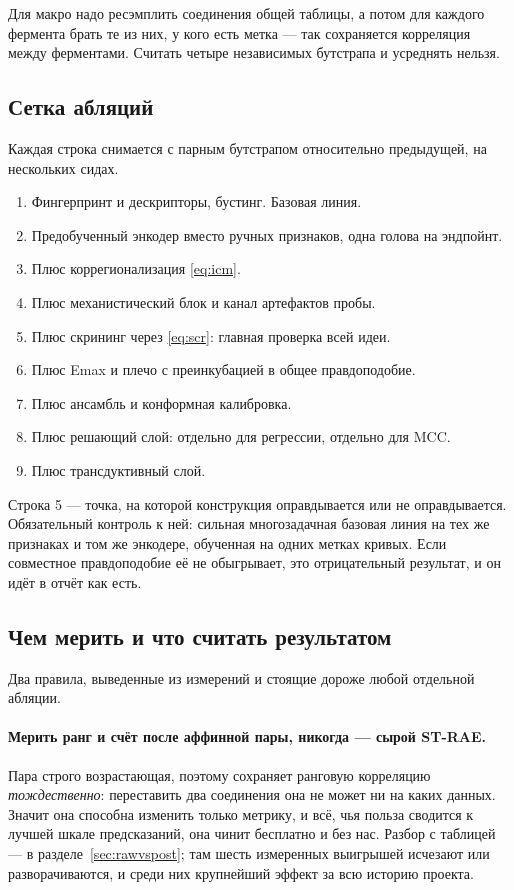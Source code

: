 Для макро надо ресэмплить соединения общей таблицы, а потом для каждого фермента брать те из них,
у кого есть метка --- так сохраняется корреляция между ферментами. Считать четыре независимых бутстрапа
и усреднять нельзя.

\subsection{Сетка абляций}

Каждая строка снимается с парным бутстрапом относительно предыдущей, на нескольких сидах.

\begin{enumerate}
\item Фингерпринт и дескрипторы, бустинг. Базовая линия.
\item Предобученный энкодер вместо ручных признаков, одна голова на эндпойнт.
\item Плюс коррегионализация \eqref{eq:icm}.
\item Плюс механистический блок и канал артефактов пробы.
\item Плюс скрининг через \eqref{eq:scr}: главная проверка всей идеи.
\item Плюс Emax и плечо с преинкубацией в общее правдоподобие.
\item Плюс ансамбль и конформная калибровка.
\item Плюс решающий слой: отдельно для регрессии, отдельно для MCC.
\item Плюс трансдуктивный слой.
\end{enumerate}

Строка 5 --- точка, на которой конструкция оправдывается или не оправдывается. Обязательный контроль
к ней: сильная многозадачная базовая линия на тех же признаках и том же энкодере, обученная на одних
метках кривых. Если совместное правдоподобие её не обыгрывает, это отрицательный результат, и он идёт
в отчёт как есть.

\subsection{Чем мерить и что считать результатом}
\label{sec:floors}

Два правила, выведенные из измерений и стоящие дороже любой отдельной абляции.

\paragraph{Мерить ранг и счёт после аффинной пары, никогда --- сырой ST-RAE.} Пара строго
возрастающая, поэтому сохраняет ранговую корреляцию \emph{тождественно}: переставить два соединения
она не может ни на каких данных. Значит она способна изменить только метрику, и всё, чья польза
сводится к лучшей шкале предсказаний, она чинит бесплатно и без нас. Разбор с таблицей --- в
разделе~\ref{sec:rawvspost}; там шесть измеренных выигрышей исчезают или разворачиваются, и среди них
крупнейший эффект за всю историю проекта.

